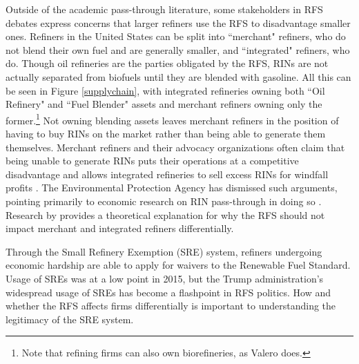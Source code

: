 \documentclass[11pt]{article}
\begin{document}
Outside of the academic pass-through literature, some stakeholders in RFS debates express concerns that larger refiners use the RFS to disadvantage smaller ones. Refiners in the United States can be split into ``merchant" refiners, who do not blend their own fuel and are generally smaller, and ``integrated" refiners, who do. Though oil refineries are the parties obligated by the RFS, RINs are not actually separated from biofuels until they are blended with gasoline. All this can be seen in Figure \ref{supplychain}, with integrated refineries owning both ``Oil Refinery" and ``Fuel Blender" assets and merchant refiners owning only the former.\footnote{Note that refining firms can also own biorefineries, as Valero does.}  Not owning blending assets leaves merchant refiners in the position of having to buy RINs on the market rather than being able to generate them themselves. Merchant refiners and their advocacy organizations often claim that being unable to generate RINs puts their operations at a competitive disadvantage and allows integrated refineries to sell excess RINs for windfall profits \citep[see discussion and footnotes in][p. 21-31]{EnvironmentalProtectionAgency2017}. The Environmental Protection Agency has dismissed such arguments, pointing primarily to economic research on RIN pass-through in doing so \citep{EnvironmentalProtectionAgency2017}. Research by \cite{Babcock2016} provides a theoretical explanation for why the RFS should not impact merchant and integrated refiners differentially. 

Through the Small Refinery Exemption (SRE) system, refiners undergoing economic hardship are able to apply for waivers to the Renewable Fuel Standard. Usage of SREs was at a low point in 2015, but the Trump administration's widespread usage of SREs has become a flashpoint in RFS politics. How and whether the RFS affects firms differentially is important to understanding the legitimacy of the SRE system.
\end{document}
